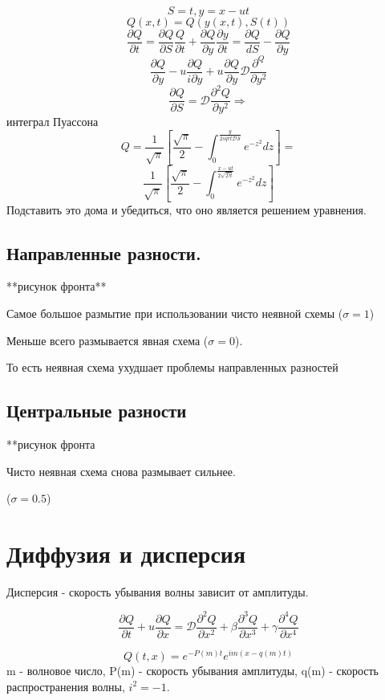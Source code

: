\documentclass[14pt]{extarticle}
\begin{document}
\[ S = t, y = x - ut \]
\[ Q(x,t) = Q(y(x,t), S(t)) \]
\[ \frac{\partial Q }{\partial t } = \frac{\partial Q }{\partial S} \frac{ Q }{\partial t } + \frac{\partial Q }{\partial y}\frac{\partial y}{\partial t} = \frac{\partial Q }{d S}- \frac{\partial Q }{\partial y}\]
\[ \frac{\partial Q}{\partial y} - u \frac{\partial Q}{i\partial y}+ u \frac{\partial Q }{\partial y } \mathcal{D } \frac{\partial^Q }{\partial y^2} \]
\[ \frac{\partial Q }{\partial S } = \mathcal{D } \frac{\partial^2 Q}{\partial y^2} \Rightarrow\] интеграл Пуассона
\[ Q = \frac{1}{\sqrt{\pi}} [\frac{\sqrt{\pi}}{2} - \int_{0}^{\frac{y}{2 sqrt{\mathcal{D S}}}} e^{-z^2} dz] =  \]
\[ \frac{1}{\sqrt{\pi}} [\frac{\sqrt{\pi}}{2} - \int_{0}^{\frac{x - ut }{2 \sqrt{\mathcal{D }t }}} e^{-z^2} dz] \]
Подставить это дома и убедиться, что оно является решением уравнения.

\subsection{Направленные разности.}

**рисунок фронта**

Самое большое размытие при использовании чисто неявной схемы ($ \sigma = 1 $)

Меньше всего размывается явная схема ($ \sigma = 0 $).

То есть неявная схема ухудшает проблемы направленных разностей

\subsection{Центральные разности}

**рисунок фронта

Чисто неявная схема снова размывает сильнее.

($ \sigma = 0.5 $)

\section{Диффузия и дисперсия}

Дисперсия - скорость убывания волны зависит от амплитуды.

\[ \frac{\partial Q }{\partial t} + u \frac{\partial Q }{\partial x } = \mathcal{D } \frac{\partial^2 Q }{\partial x^2 } + \beta \frac{\partial^3 Q }{\partial x^3 } + \gamma \frac{\partial^4 Q }{\partial x^4} \]

\[Q(t, x) = e^{-P(m)t} e^{i m (x - q(m) t)} \]
m - волновое число,
P(m) - скорость убывания амплитуды,
q(m) - скорость распространения волны,
$ i^2 = -1 $.
\end{document}
